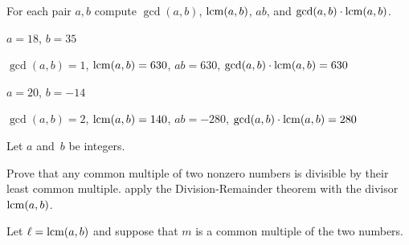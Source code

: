 \documentclass{test}  %
\begin{document}
\begin{euclidproof}
\begin{problem}
For each pair $a,b$ compute $\gcd(a,b)$, $\operatorname{lcm}(a,b)$, $ab$, and
$\gcd(a,b)\cdot\operatorname{lcm}(a,b)$.
\begin{exes}
\begin{exercise} 
  $a=18$, $b=35$
\end{exercise}  
\begin{answer}
  $\gcd(a,b)=1$, $\operatorname{lcm}(a,b)=630$, $ab=630$, $\gcd(a,b)\cdot\operatorname{lcm}(a,b)=630$
\end{answer}
\begin{exercise} 
  $a=20$, $b=-14$
\end{exercise}
\begin{answer}
  $\gcd(a,b)=2$, $\operatorname{lcm}(a,b)=140$, $ab=-280$, $\gcd(a,b)\cdot\operatorname{lcm}(a,b)=280$  
\end{answer}
\end{exes}
\end{problem}

\begin{problem} Let $a$ and~$b$ be integers.
\begin{exes}  %
\begin{exercise} 
   Prove that any common multiple of two nonzero
   numbers is divisible by their 
  least common multiple.
  \hint apply the Division-Remainder theorem with the divisor $\operatorname{lcm}(a,b)$.
\end{exercise}
\begin{answer}
  Let $\ell=\operatorname{lcm}(a,b)$ and suppose that $m$ is a common multiple
  of the two numbers.


\end{answer}
\end{exes}
\end{problem}
\end{euclidproof}
\end{document}
